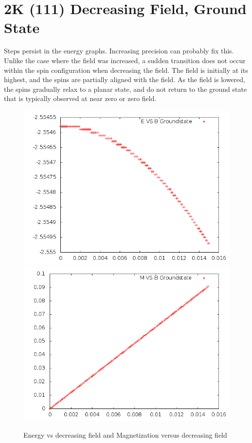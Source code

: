 \documentclass{article}
\begin{document}
\section{2K (111) Decreasing Field, Ground State}
Steps persist in the energy graphs. Increasing precision can probably fix this. Unlike the case where the
field was increased, a sudden transition does not occur within the spin configuration when decreasing
the field. The field is initially at its highest, and the spins are partially aligned with the field. 
As the field is lowered, the spins gradually relax to a planar state, and do not return to the 
ground state that is typically observed at near zero or zero field. 
\begin{figure}[ht]
 \centering 
\includegraphics[scale=0.3]{111_2000/E005to000G.png}
\includegraphics[scale=0.3]{111_2000/M005to000G.png}
\caption{Energy vs decreasing field and Magnetization versus decreasing field}
\end{figure}
\end{document}
